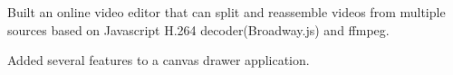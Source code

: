 \begin{cventry}
  \item Built an online video editor that can split and reassemble videos from multiple sources based on Javascript H.264 decoder(Broadway.js) and ffmpeg.
  \item Added several features to a canvas drawer application.
\end{cventry}
